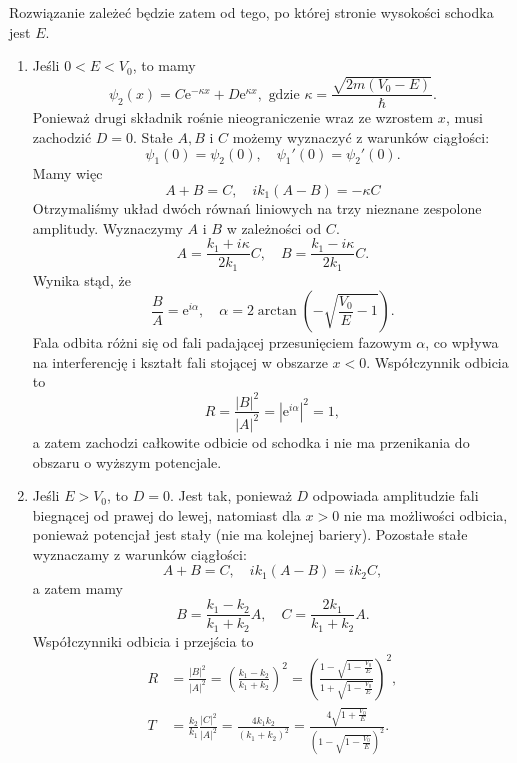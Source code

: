Rozwiązanie zależeć będzie zatem od tego, po której stronie wysokości schodka jest $E$.
\begin{enumerate}
	\item Jeśli $0 < E < V_0$, to mamy \begin{equation*}
		\psi_2(x) = C \mathrm{e}^{-\kappa x} + D \mathrm{e}^{\kappa x}, \text{ gdzie } \kappa = \frac{\sqrt{2m(V_0 - E)}}{\hbar}.
	\end{equation*}
	Ponieważ drugi składnik rośnie nieograniczenie wraz ze wzrostem $x$, musi zachodzić $D = 0$. Stałe $A, B$ i $C$ możemy wyznaczyć z warunków ciągłości:
	\begin{equation*}
		\psi_1(0) = \psi_2(0), \quad \psi_1'(0) = \psi_2'(0).
	\end{equation*}
	Mamy więc 
	\begin{equation*}
		A + B = C, \quad i k_1 (A - B) = -\kappa C
	\end{equation*}
	Otrzymaliśmy układ dwóch równań liniowych na trzy nieznane zespolone amplitudy. Wyznaczymy $A$ i $B$ w zależności od $C$.
	\begin{equation*}
		A = \frac{k_1 + i\kappa}{2k_1}C, \quad B = \frac{k_1 - i\kappa}{2k_1}C.
	\end{equation*}
	Wynika stąd, że
	\begin{equation*}
		\frac{B}{A} = \mathrm{e}^{i\alpha}, \quad \alpha = 2\arctan\left(-\sqrt{\frac{V_0}{E} - 1}\right).
	\end{equation*}
	Fala odbita różni się od fali padającej przesunięciem fazowym $\alpha$, co wpływa na interferencję i kształt fali stojącej w obszarze $x<0$.
	Współczynnik odbicia to
	\begin{equation*}
		R = \frac{|B|^2}{|A|^2} = |\mathrm{e}^{i\alpha}|^2 = 1,
	\end{equation*}
	a zatem zachodzi całkowite odbicie od schodka i nie ma przenikania do obszaru o wyższym potencjale.
	
	\item Jeśli $E > V_0$, to $D = 0$. Jest tak, ponieważ $D$ odpowiada amplitudzie fali biegnącej od prawej do lewej, natomiast dla $x>0$ nie ma możliwości odbicia, ponieważ potencjał jest stały (nie ma kolejnej bariery). Pozostałe stałe wyznaczamy z warunków ciągłości:
	\begin{equation*}
		A + B = C, \quad ik_1 (A - B) = ik_2 C,
	\end{equation*}
	a zatem mamy
	\begin{equation*}
		B = \frac{k_1 - k_2}{k_1 + k_2}A, \quad C = \frac{2k_1 }{k_1 + k_2}A.
	\end{equation*}
	Współczynniki odbicia i przejścia to
	\begin{align*}
		R &= \frac{|B|^2}{|A|^2} = \left(\frac{k_1 - k_2}{k_1 + k_2}\right)^2 = \left(\frac{1 - \sqrt{1 - \frac{V_0}{E}}}{1 + \sqrt{1 - \frac{V_0}{E}}}\right)^2,\\
		T &= \frac{k_2}{k_1}\frac{|C|^2}{|A|^2} = \frac{4k_1k_2}{(k_1 + k_2)^2} = \frac{4\sqrt{1 + \frac{V_0}{E}}}{\left(1 - \sqrt{1 - \frac{V_0}{E}}\right)^2}.
	\end{align*}
	

\end{enumerate}
